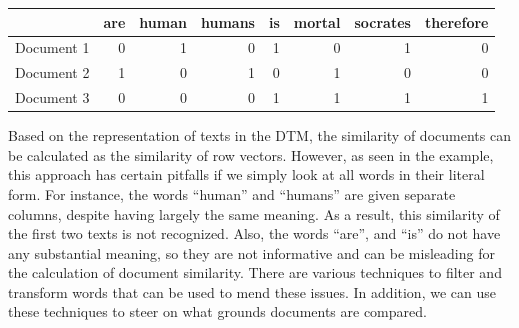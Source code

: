 \documentclass[]{article}
\begin{document}
\begin{longtable}[c]{@{}lrrrrrrr@{}}
\toprule
& are & human & humans & is & mortal & socrates &
therefore\tabularnewline
\midrule
\endhead
Document 1 & 0 & 1 & 0 & 1 & 0 & 1 & 0\tabularnewline
Document 2 & 1 & 0 & 1 & 0 & 1 & 0 & 0\tabularnewline
Document 3 & 0 & 0 & 0 & 1 & 1 & 1 & 1\tabularnewline
\bottomrule
\end{longtable}

Based on the representation of texts in the DTM, the similarity of
documents can be calculated as the similarity of row vectors. However,
as seen in the example, this approach has certain pitfalls if we simply
look at all words in their literal form. For instance, the words
``human'' and ``humans'' are given separate columns, despite having
largely the same meaning. As a result, this similarity of the first two
texts is not recognized. Also, the words ``are'', and ``is'' do not have
any substantial meaning, so they are not informative and can be
misleading for the calculation of document similarity. There are various
techniques to filter and transform words that can be used to mend these
issues. In addition, we can use these techniques to steer on what
grounds documents are compared.
\end{document}
